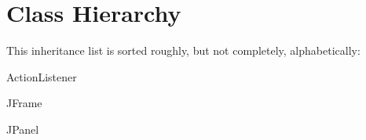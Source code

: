\section{Class Hierarchy}
This inheritance list is sorted roughly, but not completely, alphabetically\+:\begin{DoxyCompactList}
\item Action\+Listener\begin{DoxyCompactList}
\item {}
\end{DoxyCompactList}
\item J\+Frame\begin{DoxyCompactList}
\item {}
\end{DoxyCompactList}
\item J\+Panel\begin{DoxyCompactList}
\item {}
\end{DoxyCompactList}
\end{DoxyCompactList}
